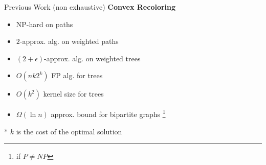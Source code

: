 \begin{frame}{Previous Work (non exhaustive)}
\textbf{Convex Recoloring}
\begin{itemize}

\pause\item
NP-hard on paths 
{}

\pause\item
$2$-approx. alg. on weighted paths 
{}

\pause\item
$(2 + \epsilon)$-approx. alg. on weighted trees 
{}

\pause\item
$O(n k 2^{k})$ FP alg. for trees
{}

\pause\item
$O(k^2)$ kernel size for trees
{}

\pause\item
$\Omega(\ln{n})$ approx. bound for bipartite graphs 
\footnote{if $P \neq NP$}
{}


\end{itemize}
* $k$ is the cost of the optimal solution
\end{frame}